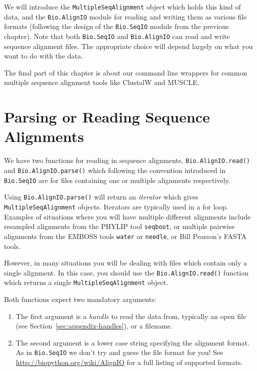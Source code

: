 \documentclass{report}
\begin{document}
We will introduce the \verb|MultipleSeqAlignment| object which holds this kind of data,
and the \verb|Bio.AlignIO| module for reading and writing them as various file formats
(following the design of the \verb|Bio.SeqIO| module from the previous chapter).
Note that both \verb|Bio.SeqIO| and \verb|Bio.AlignIO| can read and write sequence
alignment files.  The appropriate choice will depend largely on what you want to do
with the data.

The final part of this chapter is about our command line wrappers for common multiple
sequence alignment tools like ClustalW and MUSCLE.

\section{Parsing or Reading Sequence Alignments}

We have two functions for reading in sequence alignments, \verb|Bio.AlignIO.read()| and \verb|Bio.AlignIO.parse()| which following the convention introduced in \verb|Bio.SeqIO| are for files containing one or multiple alignments respectively.

Using \verb|Bio.AlignIO.parse()| will return an {\it iterator} which gives \verb|MultipleSeqAlignment| objects.  Iterators are typically used in a for loop.  Examples of situations where you will have multiple different alignments include resampled alignments from the PHYLIP tool \verb|seqboot|, or multiple pairwise alignments from the EMBOSS tools \verb|water| or \verb|needle|, or Bill Pearson's FASTA tools.

However, in many situations you will be dealing with files which contain only a single alignment.  In this case, you should use the \verb|Bio.AlignIO.read()| function which returns a single \verb|MultipleSeqAlignment| object.

Both functions expect two mandatory arguments:

\begin{enumerate}
\item The first argument is a {\it handle} to read the data from, typically an open file (see Section~\ref{sec:appendix-handles}), or a filename.
\item The second argument is a lower case string specifying the alignment format.  As in \verb|Bio.SeqIO| we don't try and guess the file format for you!  See \url{http://biopython.org/wiki/AlignIO} for a full listing of supported formats.
\end{enumerate}
\end{document}
